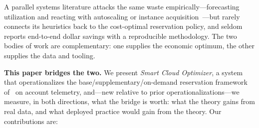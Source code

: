 \documentclass[10pt,journal]{IEEEtran}
\begin{document}
A parallel systems literature attacks the same waste
empirically---forecasting utilization and reacting with autoscaling or
instance
acquisition~\cite{chaisiri2012provisioning,wang2014optimal,hosseini2020switch,kirchoff2024provisioning,agullo2025forecasting,rzadca2020autopilot}---but
rarely connects its heuristics back to the cost-optimal reservation policy,
and seldom reports end-to-end dollar savings with a reproducible methodology.
The two bodies of work are complementary: one supplies the economic optimum,
the other supplies the data and tooling.

\textbf{This paper bridges the two.} We present \emph{Smart Cloud Optimizer},
a system that operationalizes the base/supplementary/on-demand reservation
framework of~\cite{chen2024capacity} on account telemetry, and---new relative
to prior operationalizations---we measure, in both directions, what the
bridge is worth: what the theory gains from real data, and what deployed
practice would gain from the theory. Our contributions are:
\end{document}
